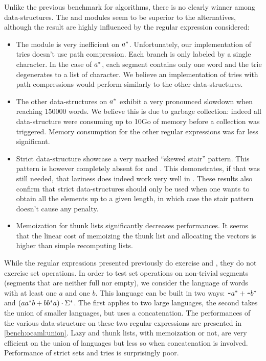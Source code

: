 Unlike the previous benchmark for algorithms, there is no clearly winner
among data-structures. The  and  modules seem to
be superior to the alternatives, although the result are highly influenced by
the regular expression considered:
\begin{itemize}[leftmargin=*]
\item The  module is very inefficient on $a^*$. Unfortunately,
  our implementation of tries doesn't use path compression. Each
  branch is only labeled by a single character.
  In the case of $a^*$, each segment contains only one word and the
  trie degenerates to a list of character.
  We believe
  an implementation of tries with path compressions would perform similarly to
  the other data-structures.
\item The other data-structures on $a^*$ exhibit a very pronounced slowdown
  when reaching 150000 words.
  We believe this is due to garbage collection: indeed
  all data-structure were consuming up to 10Go of memory before
  a collection was triggered. Memory consumption for the other regular
  expressions was far less significant.
\item Strict data-structure showcase a very marked ``skewed stair'' pattern.
  This pattern is however completely absent for  and
  . This demonstrates, if that was still needed,
  that laziness does indeed work very well in \ocaml. These results also confirm
  that strict data-structures should only be used when one wants to obtain
  all the elements up to a given length, in which case the stair pattern
  doesn't cause any penalty.
\item Memoization for thunk lists significantly decreases performances. It seems
  that the linear cost of memoizing the thunk list and allocating the vectors
  is higher than simple recomputing lists.
\end{itemize}

While the regular expressions presented previously do exercise
 and , they do not exercise set operations.
In order to test set operations on non-trivial segments (segments that
are neither full nor empty), we consider the language of words with at least
one $a$ and one $b$. This language can be built in two ways:
$\texttt{\textasciitilde}{a^*} +{\texttt{\textasciitilde}{b^*}}$ and
$(aa^*b +{bb^*a}) \cdot{\Sigma^*}$.
The first applies  to two large languages, the second takes
the union of smaller languages, but uses a concatenation.
The performances of the various data-structure on these two regular expressions
are presented in \cref{bench:ocaml:union}.
Lazy and thunk lists, with memoization or not, are very efficient on the union of languages but less so when concatenation is involved. Performance of strict sets and tries is surprisingly poor.

